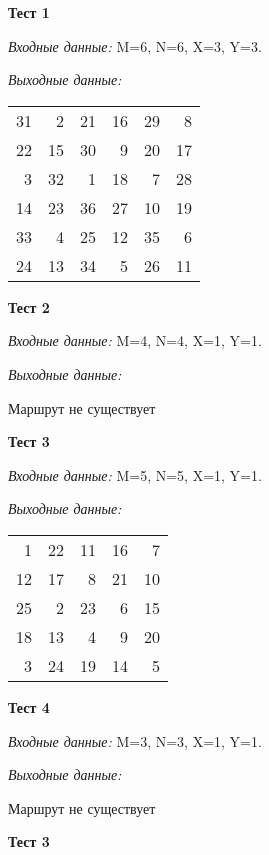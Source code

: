 \documentclass[a4paper,12pt]{article}
\begin{document}
	\textbf{Тест 1}
	
	\textit{Входные данные:} M=6, N=6, X=3, Y=3.
	
	\textit{Выходные данные:} \newline
	\begin{center}
	\begin{tabular}{*{6}{r}}
		31 &  2 & 21 & 16 & 29 &  8 \\ 
		22 & 15 & 30 &  9 & 20 & 17 \\
		3 & 32 &  1 & 18 &  7 & 28 \\
		14 & 23 & 36 & 27 & 10 & 19 \\
		33 &  4 & 25 & 12 & 35 &  6 \\
		24 & 13 & 34 &  5 & 26 & 11 \\
	\end{tabular}
	\end{center}
	
	\textbf{Тест 2}
	
	\textit{Входные данные:} M=4, N=4, X=1, Y=1.
	
	\textit{Выходные данные:} \newline
	\begin{center}
		Маршрут не существует
	\end{center}
	
	\textbf{Тест 3}
	
	\textit{Входные данные:} M=5, N=5, X=1, Y=1.
	
	\textit{Выходные данные:} \newline
	\begin{center}
		\begin{tabular}{*{5}{r}}
			1 & 22 & 11 & 16 &  7 \\
			12 & 17 &  8 & 21 & 10 \\
			25 &  2 & 23 &  6 & 15 \\
			18 & 13 &  4 &  9 & 20 \\
			3 & 24 & 19 & 14 &  5 \\
		\end{tabular}
	\end{center}
	
	\textbf{Тест 4}
	
	\textit{Входные данные:} M=3, N=3, X=1, Y=1.
	
	\textit{Выходные данные:} \newline
	\begin{center}
		Маршрут не существует
	\end{center}
	
	\textbf{Тест 3}
	

	
\end{document}
